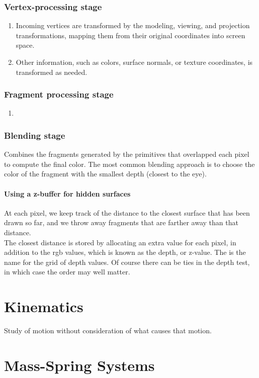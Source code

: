 \documentclass[11pt]{article}
\numberwithin{equation}{section}
\begin{document}
\subsubsection{Vertex-processing stage}
\begin{enumerate}
	\item Incoming vertices are transformed by the modeling, viewing, and projection transformations, mapping them from their original coordinates into screen space.
	\item Other information, such as colors, surface normals, or texture coordinates, is transformed as needed.
\end{enumerate}

\subsubsection{Fragment processing stage}
\begin{enumerate}
	\item 
\end{enumerate}
\subsubsection{Blending stage}
Combines the fragments generated by the primitives that overlapped each pixel to compute the final color. The most common blending approach is to choose the color of the fragment with the smallest depth (closest to the eye).
 
\paragraph{Using a z-buffer for hidden surfaces}
At each pixel, we keep track of the distance to the closest surface that has been drawn so far, and we throw away fragments that are farther away than that distance.\\
The closest distance is stored by allocating an extra value for each pixel, in addition to the rgb values, which is known as the depth, or z-value. The  is the name for the grid of depth values.
\remark
Of course there can be ties in the depth test, in which case the order may well matter.

\section{Kinematics}
Study of motion without consideration of what causes that motion.
\section{Mass-Spring Systems}
\end{document}
